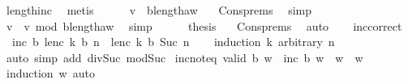 \begin{isabellebody}
\ length{\isacharunderscore}{\kern0pt}inc\ \isamarkupfalse%
\ metis\isanewline
\ \ \ \ \isamarkupfalse%
\ {\isachardoublequoteopen}{\isacharquery}{\kern0pt}v\ {\isacharless}{\kern0pt}\ b{\isacharcircum}{\kern0pt}length{\isacharparenleft}{\kern0pt}a{\isacharhash}{\kern0pt}w{\isacharparenright}{\kern0pt}{\isachardoublequoteclose}\ \isamarkupfalse%
\ {\isachardoublequoteopen}{}{\isachardoublequoteclose}\ Cons{\isachardot}{\kern0pt}prems\ \isamarkupfalse%
\ simp\isanewline
\ \ \ \ \isamarkupfalse%
\ {\isachardoublequoteopen}{\isacharquery}{\kern0pt}v\ {\isacharequal}{\kern0pt}\ {\isacharquery}{\kern0pt}v\ mod\ b{\isacharcircum}{\kern0pt}length{\isacharparenleft}{\kern0pt}a{\isacharhash}{\kern0pt}w{\isacharparenright}{\kern0pt}{\isachardoublequoteclose}\ \isamarkupfalse%
\ simp\isanewline
\ \ \ \ \isamarkupfalse%
\ {\isacharquery}{\kern0pt}thesis\ \isamarkupfalse%
\ {\isachardoublequoteopen}{}{\isachardoublequoteclose}\ Cons{\isachardot}{\kern0pt}prems\ \isamarkupfalse%
\ auto\isanewline
\ \ \isamarkupfalse%
\isanewline
{}\isamarkupfalse%
%
\endisatagproof
{\isafoldproof}%
%
\isadelimproof
\isanewline
%
\endisadelimproof
\isanewline
{}\isamarkupfalse%
\ inc{\isacharunderscore}{\kern0pt}correct{\isacharcolon}{\kern0pt}\isanewline
\ \ {\isachardoublequoteopen}inc\ b\ {\isacharparenleft}{\kern0pt}lenc\ k\ b\ n{\isacharparenright}{\kern0pt}\ {\isacharequal}{\kern0pt}\ lenc\ k\ b\ {\isacharparenleft}{\kern0pt}Suc\ n{\isacharparenright}{\kern0pt}{\isachardoublequoteclose}\isanewline
%
\isadelimproof
\ \ %
\endisadelimproof
%
\isatagproof
{}\isamarkupfalse%
\ {\isacharparenleft}{\kern0pt}induction\ k\ arbitrary{\isacharcolon}{\kern0pt}\ n{\isacharparenright}{\kern0pt}\isanewline
\ \ \isamarkupfalse%
\ {\isacharparenleft}{\kern0pt}auto\ simp\ add{\isacharcolon}{\kern0pt}\ div{\isacharunderscore}{\kern0pt}Suc\ mod{\isacharunderscore}{\kern0pt}Suc{\isacharparenright}{\kern0pt}%
\endisatagproof
{\isafoldproof}%
%
\isadelimproof
\isanewline
%
\endisadelimproof
\isanewline
{}\isamarkupfalse%
\ inc{\isacharunderscore}{\kern0pt}not{\isacharunderscore}{\kern0pt}eq{\isacharcolon}{\kern0pt}\ {\isachardoublequoteopen}valid\ b\ w\ {\isasymLongrightarrow}\ {\isacharparenleft}{\kern0pt}inc\ b\ w\ {\isacharequal}{\kern0pt}\ w{\isacharparenright}{\kern0pt}\ {\isacharequal}{\kern0pt}\ {\isacharparenleft}{\kern0pt}w\ {\isacharequal}{\kern0pt}\ {\isacharbrackleft}{\kern0pt}{\isacharbrackright}{\kern0pt}{\isacharparenright}{\kern0pt}{\isachardoublequoteclose}\isanewline
%
\isadelimproof
\ \ %
\endisadelimproof
%
\isatagproof
{}\isamarkupfalse%
\ {\isacharparenleft}{\kern0pt}induction\ w{\isacharparenright}{\kern0pt}\ auto%
\endisatagproof
{\isafoldproof}%
%
\isadelimproof
\isanewline
%
\endisadelimproof
%
\isadelimtheory
\isanewline
%
\endisadelimtheory
%
\isatagtheory
{}\isamarkupfalse%
%
\endisatagtheory
{\isafoldtheory}%
%
\isadelimtheory
%
\endisadelimtheory
%
\end{isabellebody}%
